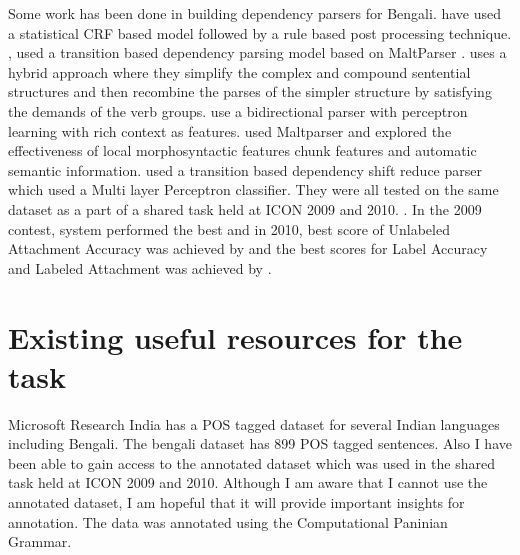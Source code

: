 \documentclass[11pt,letterpaper]{article}
\begin{document}
Some work has been done in building dependency parsers for Bengali. \citep{ghosh2009dependency} have used a statistical CRF based model followed by a rule based post processing technique. \citep{Nivre_parsingindian}, \citep{ambati_09} used a transition based dependency parsing model based on MaltParser \citep{Nivre05maltparser:a}. \citep{De_Dep_ben} uses a hybrid approach where they simplify the complex and compound sentential structures and then recombine the parses of the simpler structure by satisfying the demands of the verb groups. \citep{bidir_parser} use a bidirectional parser with perceptron learning with rich context as features. \citep{kosaraju_10} used Maltparser and explored the effectiveness of local morphosyntactic features chunk features and automatic semantic information. \citep{attardi_10} used a transition based dependency shift reduce parser which used a Multi layer Perceptron classifier. They were all tested on the same dataset as a part of a shared task held at ICON 2009 and 2010. \citep{husain_09, husain_10}. In the 2009 contest, \citep{ambati_09} system performed the best and in 2010, best score of Unlabeled Attachment Accuracy was achieved by \citep{attardi_10} and the best scores for Label Accuracy and Labeled Attachment was achieved by  \citep{kosaraju_10}.

\section{Existing useful resources for the task}
Microsoft Research India has a POS tagged dataset for several Indian languages including Bengali. The bengali dataset has 899 POS tagged sentences. Also I have been able to gain access to the annotated dataset which was used in the shared task held at ICON 2009 and 2010. Although I am aware that I cannot use the annotated dataset, I am hopeful that it will provide important insights for annotation. The data was annotated using the Computational Paninian Grammar. \citep{Bharati}



\newpage




\label{lastpage}
\end{document}

